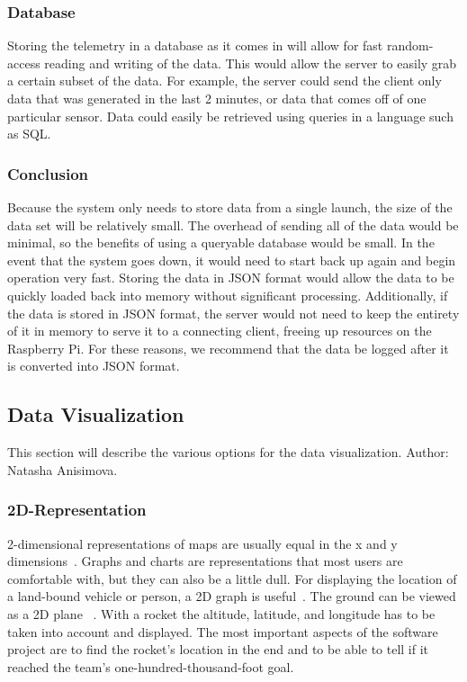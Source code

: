 \documentclass[10pt,draftclsnofoot,onecolumn]{IEEEtran}
\begin{document}
	\subsubsection{Database}
	Storing the telemetry in a database as it comes in will allow for fast random-access reading and writing of the data.
	This would allow the server to easily grab a certain subset of the data.
	For example, the server could send the client only data that was generated in the last 2 minutes, or data that comes off of one particular sensor.
	Data could easily be retrieved using queries in a language such as SQL.
	
	\subsubsection{Conclusion}
	Because the system only needs to store data from a single launch, the size of the data set will be relatively small.
	The overhead of sending all of the data would be minimal, so the benefits of using a queryable database would be small.
	In the event that the system goes down, it would need to start back up again and begin operation very fast.
	Storing the data in \ac{JSON} format would allow the data to be quickly loaded back into memory without significant processing.
	Additionally, if the data is stored in \ac{JSON} format, the server would not need to keep the entirety of it in memory to serve it to a connecting client, freeing up resources on the Raspberry Pi.
	For these reasons, we recommend that the data be logged after it is converted into \ac{JSON} format.

	\subsection{Data Visualization}
	This section will describe the various options for the data visualization. Author: Natasha Anisimova.
	
	\subsubsection{2D-Representation}
	2-dimensional representations of maps are usually equal in the x and y dimensions~\cite{2d-is-better-than-3d}. 
	Graphs and charts are representations that most users are comfortable with, but they can also be a little dull.
	For displaying the location of a land-bound vehicle or person, a 2D graph is useful~\cite{2ds-company-3ds-a-crowd}. 
	The ground can be viewed as a 2D plane ~\cite{2d-and-3d-presentation-of-spatial-data}.
	With a rocket the altitude, latitude, and longitude has to be taken into account and displayed. 
	The most important aspects of the software project are to find the rocket's location in the end and to be able to tell 
	if it reached the team's one-hundred-thousand-foot goal. 
	
\end{document}
